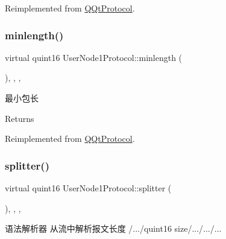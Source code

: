 Reimplemented from \mbox{\hyperlink{class_q_qt_protocol_af41bc3116abbbcfc9af45e151a253ff7}{Q\+Qt\+Protocol}}.

\mbox{\label{class_user_node1_protocol_a7baf2b30d60e548703181aee9063e3ef}} 
\subsubsection{\texorpdfstring{minlength()}{minlength()}}
{\footnotesize\ttfamily virtual quint16 User\+Node1\+Protocol\+::minlength (\begin{DoxyParamCaption}{ }\end{DoxyParamCaption})\hspace{0.3cm}{\ttfamily [inline]}, {\ttfamily [override]}, {\ttfamily [protected]}, {\ttfamily [virtual]}}



最小包长 

\begin{DoxyReturn}{Returns}

\end{DoxyReturn}


Reimplemented from \mbox{\hyperlink{class_q_qt_protocol_a2b00f53d3dd0eed817eeecff422891f3}{Q\+Qt\+Protocol}}.

\mbox{\label{class_user_node1_protocol_a10c088835708f2e7f9f96b6c9a3711cf}} 
\subsubsection{\texorpdfstring{splitter()}{splitter()}}
{\footnotesize\ttfamily virtual quint16 User\+Node1\+Protocol\+::splitter (\begin{DoxyParamCaption}\item[{const Q\+Byte\+Array \&}]{ }\end{DoxyParamCaption})\hspace{0.3cm}{\ttfamily [inline]}, {\ttfamily [override]}, {\ttfamily [protected]}, {\ttfamily [virtual]}}



语法解析器 从流中解析报文长度 /.../quint16 size/.../.../... 


